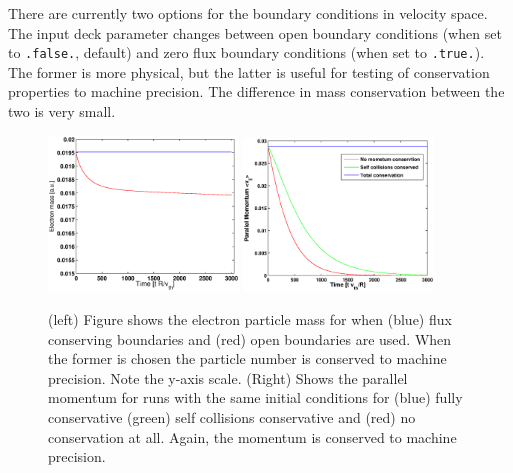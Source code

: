 There are currently two options for the boundary conditions in velocity space.  The input deck parameter  changes between open boundary conditions (when set to \texttt{.false.}, default) and zero flux boundary conditions (when set to \texttt{.true.}).  The former is more physical, but the latter is useful for testing of conservation properties to machine precision. The difference in mass conservation between the two is very small.
\begin{figure}
\begin{center}
\includegraphics[width=0.45\textwidth]{../benchmarks/collisions/MassConservation.eps}
\includegraphics[width=0.45\textwidth]{../benchmarks/collisions/MomentumCons.eps}
\caption{(left) Figure shows the electron particle mass for when (blue) flux conserving boundaries and (red) open boundaries are used.  When the former is chosen the particle number is conserved to machine precision.  
Note the y-axis scale.  (Right) Shows the parallel momentum for runs with the same initial conditions for (blue) fully conservative (green) self collisions conservative
and (red) no conservation at all.  Again, the momentum is conserved to machine precision.  }
\end{center}
\end{figure}

